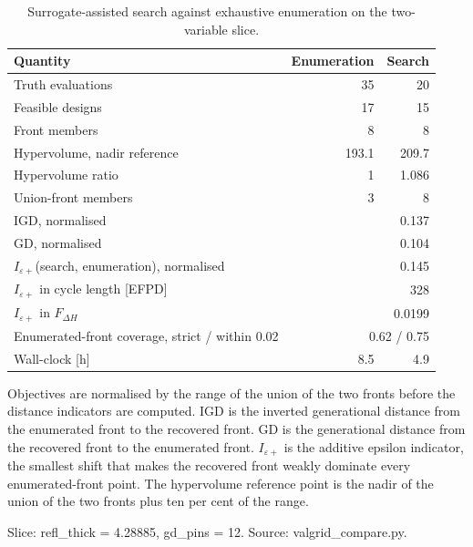 \begin{table}[htbp]
  \centering
  \begin{threeparttable}
  \caption[Search against exhaustive enumeration]{Surrogate-assisted search against exhaustive enumeration on the two-variable slice.}
  \label{tab:valgrid}
  \begin{tabular}{lrr}
    \toprule
    Quantity & Enumeration & Search \\
    \midrule
    Truth evaluations & 35 & 20 \\
    Feasible designs & 17 & 15 \\
    Front members & 8 & 8 \\
    Hypervolume, nadir reference & 193.1 & 209.7 \\
    Hypervolume ratio & 1 & 1.086 \\
    Union-front members & 3 & 8 \\
    \midrule
    IGD, normalised & \multicolumn{2}{r}{0.137} \\
    GD, normalised & \multicolumn{2}{r}{0.104} \\
    $I_{\varepsilon+}$(search, enumeration), normalised & \multicolumn{2}{r}{0.145} \\
    $I_{\varepsilon+}$ in cycle length [EFPD] & \multicolumn{2}{r}{328} \\
    $I_{\varepsilon+}$ in $F_{\Delta H}$ & \multicolumn{2}{r}{0.0199} \\
    Enumerated-front coverage, strict / within 0.02 & \multicolumn{2}{r}{0.62 / 0.75} \\
    Wall-clock [h] & 8.5 & 4.9 \\
    \bottomrule
  \end{tabular}
  \begin{tablenotes}\footnotesize
    \item Objectives are normalised by the range of the union of the two fronts before the distance indicators are computed. IGD is the inverted generational distance from the enumerated front to the recovered front. GD is the generational distance from the recovered front to the enumerated front. $I_{\varepsilon+}$ is the additive epsilon indicator, the smallest shift that makes the recovered front weakly dominate every enumerated-front point. The hypervolume reference point is the nadir of the union of the two fronts plus ten per cent of the range.
    \item Slice: refl_thick = 4.28885, gd_pins = 12. Source: valgrid\_compare.py.
  \end{tablenotes}
  \end{threeparttable}
\end{table}
